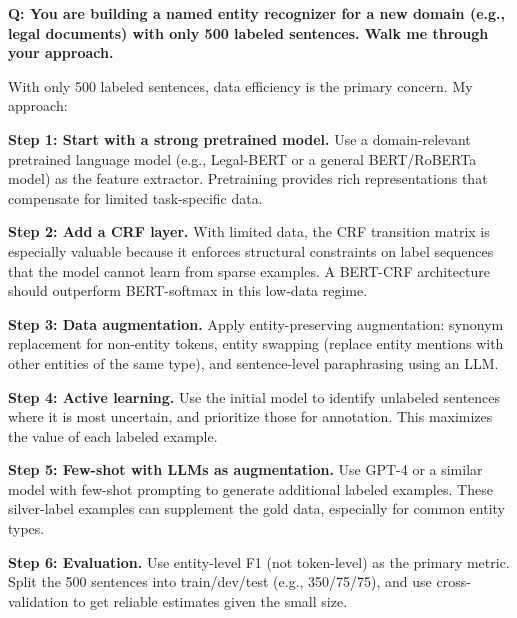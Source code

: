 \begin{interviewq}
\end{interviewq}

\vspace{0.5em}

\begin{interviewq}
\textbf{Q: You are building a named entity recognizer for a new domain
(e.g., legal documents) with only 500 labeled sentences.  Walk me through
your approach.}

 \quad {} \quad \badgefreq{\freqmed}

\stronganswer
With only 500 labeled sentences, data efficiency is the primary concern.
My approach:

\textbf{Step 1: Start with a strong pretrained model.}  Use a domain-relevant
pretrained language model (e.g., Legal-BERT or a general BERT/RoBERTa model)
as the feature extractor.  Pretraining provides rich representations that
compensate for limited task-specific data.

\textbf{Step 2: Add a CRF layer.}  With limited data, the CRF transition
matrix is especially valuable because it enforces structural constraints on
label sequences that the model cannot learn from sparse examples.  A
BERT-CRF architecture should outperform BERT-softmax in this low-data regime.

\textbf{Step 3: Data augmentation.}  Apply entity-preserving augmentation:
synonym replacement for non-entity tokens, entity swapping (replace entity
mentions with other entities of the same type), and sentence-level paraphrasing
using an LLM.

\textbf{Step 4: Active learning.}  Use the initial model to identify
unlabeled sentences where it is most uncertain, and prioritize those for
annotation.  This maximizes the value of each labeled example.

\textbf{Step 5: Few-shot with LLMs as augmentation.}  Use GPT-4 or a similar
model with few-shot prompting to generate additional labeled examples.  These
silver-label examples can supplement the gold data, especially for common
entity types.

\textbf{Step 6: Evaluation.}  Use entity-level F1 (not token-level) as the
primary metric.  Split the 500 sentences into train/dev/test (e.g.,
350/75/75), and use cross-validation to get reliable estimates given the
small size.


\end{interviewq}
